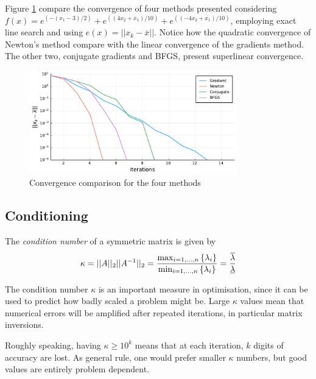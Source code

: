 Figure \ref{fig:convergence} compare the convergence of four methods presented considering $f(x)=e^{(-(x_1-3)/2)} + e^{((4x_2 + x_1)/10)} + e^{((-4x_2 + x_1)/10)}$, employing exact line search and using $e(x) = ||x_k - \overline{x}||$. Notice how the quadratic convergence of Newton's method compare with the linear convergence of the gradients method. The other two, conjugate gradients and BFGS, present superlinear convergence.

\begin{figure}
	\includegraphics[width=0.8\textwidth]{part_2/chapter_6/figures/convergence.pdf}
	\caption{Convergence comparison for the four methods}\label{fig:convergence}
\end{figure}


\subsection{Conditioning}

The \emph{condition number} of a symmetric matrix is given by 
\begin{align*}
	\kappa = ||A||_2 ||A^{-1}||_2 = \frac{\max_{i = 1,\dots,n} \left\{ \lambda_i \right \}}{\min_{i = 1,\dots,n} \left\{ \lambda_i \right \}} = \frac{\overline{\lambda}}{\underline{\lambda}}	
\end{align*}

The condition number $\kappa$ is an important measure in optimisation, since it can be used to predict how badly scaled a problem might be. Large $\kappa$ values mean that numerical errors will be amplified after repeated iterations, in particular matrix inversions.

Roughly speaking, having $\kappa \geq 10^k$ means that at each iteration, $k$ digits of accuracy are lost. As general rule, one would prefer smaller $\kappa$ numbers, but good values are entirely problem dependent. 

